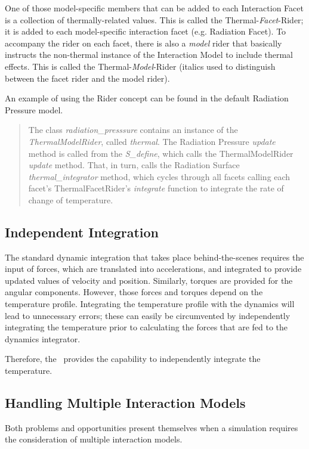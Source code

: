 One of those model-specific members that can be added to each Interaction Facet is a collection
of thermally-related values.
This is called the Thermal-\textit{Facet}-Rider; it is added to each model-specific interaction facet (e.g. Radiation Facet).  To accompany the rider on each facet, there is also a \textit{model} rider that basically instructs the non-thermal instance of the Interaction Model to include thermal effects.  This is called the Thermal-\textit{Model}-Rider (italics used to distinguish between the facet rider and the model rider).

An example of using the Rider concept can be found in the default Radiation Pressure model.  
\begin{quotation}
The class \textit{radiation\_presssure} contains an instance of the \textit{ThermalModelRider}, called \textit{thermal}.
The Radiation Pressure \textit{update} method is called from the
\textit{S\_define}, which calls the
ThermalModelRider \textit{update} method.
That, in turn, calls the Radiation Surface
\textit{thermal\_integrator} method, which cycles through all facets calling each facet's ThermalFacetRider's \textit{integrate} function to integrate the rate of change of temperature.
\end{quotation}

\subsection{Independent Integration}
The standard dynamic integration that takes place behind-the-scenes requires the
input of forces, which are translated into accelerations, and integrated to
provide updated values of velocity and position.  Similarly, torques are
provided for the angular components.  However, those forces and torques depend
on the temperature profile.  Integrating the temperature profile with the
dynamics will lead to unnecessary errors; these can easily be circumvented by independently integrating the temperature prior to calculating the forces that are fed to the dynamics integrator.

Therefore, the \ThermalRiderDesc\ provides the capability to independently integrate the temperature.

\subsection{Handling Multiple Interaction Models}
Both problems and opportunities present themselves when a simulation requires
the consideration of multiple interaction models.

